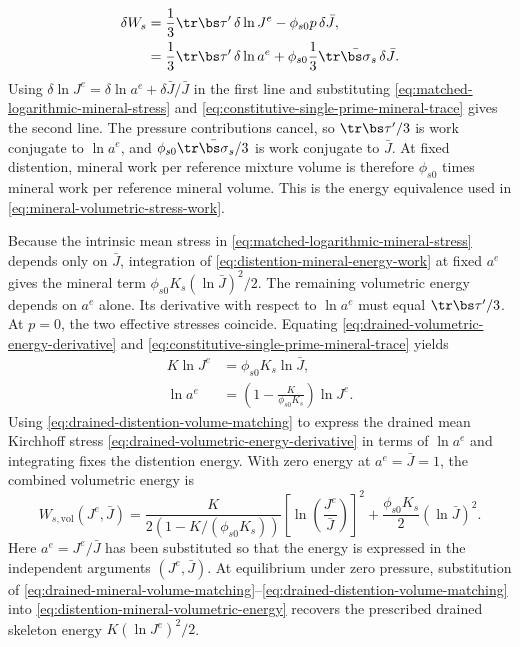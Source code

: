 \begin{align}
 \delta W_s
 &=\frac13\tr\bs\tau^{\prime}\,\delta\ln J^e
 -\phi_{s0}p\,\delta\bar J,
 \notag
\\
 &=\frac13\tr\bs\tau^{\prime}\,\delta\ln a^e
 +\phi_{s0}\frac13\tr\bar{\bs\sigma}_s\,\delta\bar J.
 \label{eq:distention-mineral-energy-work}
\end{align}
Using \(\delta\ln J^e=\delta\ln a^e+\delta\bar J/\bar J\) in the first
line and substituting \eqref{eq:matched-logarithmic-mineral-stress} and
\eqref{eq:constitutive-single-prime-mineral-trace} gives the second line.
The pressure contributions cancel, so \(\tr\bs\tau^{\prime}/3\) is work
conjugate to \(\ln a^e\), and \(\phi_{s0}\tr\bar{\bs\sigma}_s/3\) is work
conjugate to \(\bar J\).
At fixed distention, mineral work per reference mixture volume is therefore
\(\phi_{s0}\) times mineral work per reference mineral volume.  This is
the energy equivalence used in \eqref{eq:mineral-volumetric-stress-work}.

Because the intrinsic mean stress in
\eqref{eq:matched-logarithmic-mineral-stress} depends only on \(\bar J\),
integration of \eqref{eq:distention-mineral-energy-work} at fixed \(a^e\)
gives the mineral term \(\phi_{s0}K_s(\ln\bar J)^2/2\).  The remaining
volumetric energy depends on \(a^e\) alone.  Its derivative with respect
to \(\ln a^e\) must equal \(\tr\bs\tau^{\prime}/3\).
At \(p=0\), the two effective stresses coincide.  Equating
\eqref{eq:drained-volumetric-energy-derivative} and
\eqref{eq:constitutive-single-prime-mineral-trace} yields
\begin{align}
 K\ln J^e&=\phi_{s0}K_s\ln\bar J,
 \label{eq:drained-mineral-volume-matching}\\
 \ln a^e&=\left(1-\frac{K}{\phi_{s0}K_s}\right)\ln J^e.
 \label{eq:drained-distention-volume-matching}
\end{align}
Using \eqref{eq:drained-distention-volume-matching} to express the drained
mean Kirchhoff stress \eqref{eq:drained-volumetric-energy-derivative} in
terms of \(\ln a^e\) and integrating fixes the distention energy.  With zero energy at
\(a^e=\bar J=1\), the combined volumetric energy is
\begin{equation}
 W_{s,\mathrm{vol}}(J^e,\bar J)
 =\frac{K}{2\left(1-K/(\phi_{s0}K_s)\right)}
 \left[\ln\left(\frac{J^e}{\bar J}\right)\right]^2
 +\frac{\phi_{s0}K_s}{2}(\ln\bar J)^2.
 \label{eq:distention-mineral-volumetric-energy}
\end{equation}
Here \(a^e=J^e/\bar J\) has been substituted so that the energy is expressed
in the independent arguments \((J^e,\bar J)\).  At equilibrium under zero pressure, substitution of
\eqref{eq:drained-mineral-volume-matching}--\eqref{eq:drained-distention-volume-matching}
into \eqref{eq:distention-mineral-volumetric-energy} recovers the prescribed
drained skeleton energy \(K(\ln J^e)^2/2\).

